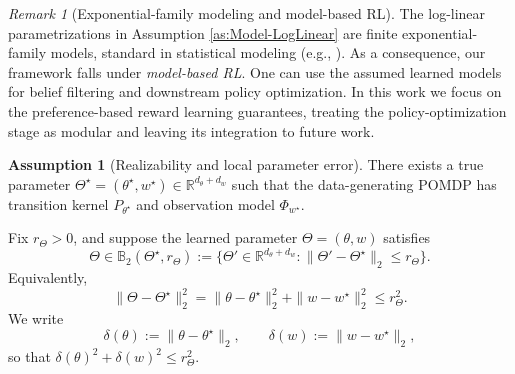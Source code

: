 \documentclass[10pt]{article} %
\theoremstyle{plain}
\theoremstyle{definition}
\newtheorem{assumption}[theorem]{Assumption}
\theoremstyle{remark}
\newtheorem{remark}[theorem]{Remark}
\newcommand{\bB}{\mathbb{B}}
\newcommand{\bR}{\mathbb{R}}
\begin{document}
\begin{remark}[Exponential-family modeling and model-based RL]\label{rem:expfam-mbrl}
The log-linear parametrizations in Assumption \ref{as:Model-LogLinear} are finite exponential-family models, standard in statistical modeling (e.g., \citet{bishop2007, wainwright2008, van2008hidden}). As a consequence, our framework falls under \emph{model-based RL}. One can use the assumed learned models for belief filtering and downstream policy optimization. In this work we focus on the preference-based reward learning guarantees, treating the policy-optimization stage as modular and leaving its integration to future work.
\end{remark}




\begin{assumption}[Realizability and local parameter error]\label{as:realizability-bounded-error}
There exists a true parameter \(\Theta^\star=(\theta^\star,w^\star)\in\mathbb{R}^{d_\theta+d_w}\)
such that the data-generating POMDP has transition kernel \(P_{\theta^\star}\) and observation model \(\Phi_{w^\star}\).

Fix \(r_\Theta>0\), and suppose the learned parameter \(\Theta=(\theta,w)\) satisfies
\[
\Theta \in \mathbb{B}_2(\Theta^\star,r_\Theta)
:= \{\Theta' \in \mathbb{R}^{d_\theta+d_w} : \|\Theta'-\Theta^\star\|_2 \le r_\Theta\}.
\]
Equivalently,
\[
\|\Theta-\Theta^\star\|_2^2
=
\|\theta-\theta^\star\|_2^2 + \|w-w^\star\|_2^2
\le r_\Theta^2.
\]
We write
\[
\delta(\theta):=\|\theta-\theta^\star\|_2,
\qquad
\delta(w):=\|w-w^\star\|_2,
\]
so that \(\delta(\theta)^2+\delta(w)^2\le r_\Theta^2\).
\end{assumption}
\end{document}
